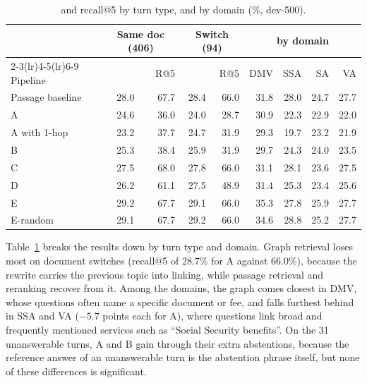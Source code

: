\begin{table}[ht]
    \centering
    \caption{\fone{} and recall@5 by turn type, and \fone{} by domain (\%, dev-500).}
    \label{tab:kgret:split}
    \small
    \begin{tabular}{lrrrrrrrr}
        \toprule
        & \multicolumn{2}{c}{Same doc (406)} & \multicolumn{2}{c}{Switch (94)} & \multicolumn{4}{c}{\fone{} by domain} \\
        \cmidrule(lr){2-3}\cmidrule(lr){4-5}\cmidrule(lr){6-9}
        Pipeline & \fone{} & R@5 & \fone{} & R@5 & DMV & SSA & SA & VA \\
        \midrule
        Passage baseline & 28.0 & 67.7 & 28.4 & 66.0 & 31.8 & 28.0 & 24.7 & 27.7 \\
        A                & 24.6 & 36.0 & 24.0 & 28.7 & 30.9 & 22.3 & 22.9 & 22.0 \\
        A with 1-hop     & 23.2 & 37.7 & 24.7 & 31.9 & 29.3 & 19.7 & 23.2 & 21.9 \\
        B                & 25.3 & 38.4 & 25.9 & 31.9 & 29.7 & 24.3 & 24.0 & 23.5 \\
        C                & 27.5 & 68.0 & 27.8 & 66.0 & 31.1 & 28.1 & 23.6 & 27.5 \\
        D                & 26.2 & 61.1 & 27.5 & 48.9 & 31.4 & 25.3 & 23.4 & 25.6 \\
        E                & 29.2 & 67.7 & 29.1 & 66.0 & 35.3 & 27.8 & 25.9 & 27.7 \\
        E-random         & 29.1 & 67.7 & 29.2 & 66.0 & 34.6 & 28.8 & 25.2 & 27.7 \\
        \bottomrule
    \end{tabular}
\end{table}

Table~\ref{tab:kgret:split} breaks the results down by turn type and domain. Graph
retrieval loses most on document switches (recall@5 of 28.7\% for A against 66.0\%),
because the rewrite carries the previous topic into linking, while passage retrieval
and reranking recover from it. Among the domains, the graph comes closest in DMV, whose
questions often name a specific document or fee, and falls furthest behind in SSA and VA
($-5.7$ points each for A), where questions link broad and frequently mentioned services
such as ``Social Security benefits''. On the 31 unanswerable turns, A and B gain \fone{}
through their extra abstentions, because the reference answer of an unanswerable turn
is the abstention phrase itself, but none of these differences is significant.

